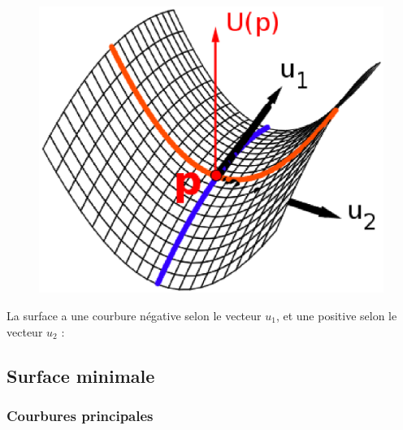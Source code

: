 \documentclass{beamer}
\begin{document}
\begin{frame}
\begin{figure}[h!]
      \centering 
      \includegraphics[scale=0.5]{2a.eps}
\end{figure} 
\pause
La surface a une courbure négative selon le vecteur $u_1$, et une positive selon le vecteur $u_2$ : 
\end {frame}

\subsection{Surface minimale}
\subsubsection{Courbures principales}
\end{document}
